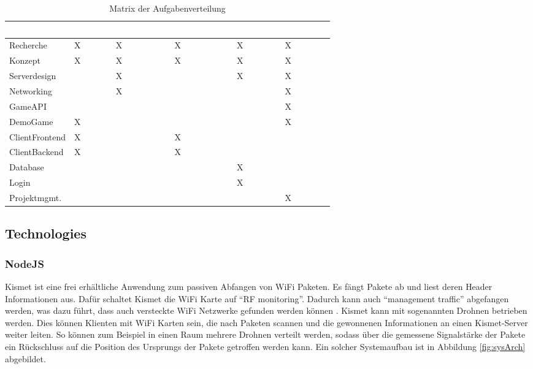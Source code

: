 \documentclass[a4paper]{spie}  %
\begin{document}
\begin{table}
	\label{table:distribution of tasks}
	\centering
		\caption{Matrix der Aufgabenverteilung}
		\begin{tabular}{| L{2.6cm} | C{2cm} | C{2cm} | C{2cm} | C{2cm} | C{2cm} |}
		\hline
		\textcolor{white}{\textbf{Aufgabe}} & \textcolor{white}{\textbf{Schleiss}} & \textcolor{white}{\textbf{Grothknopf}} & \textcolor{white}{\textbf{Schiwkowksi}} & \textcolor{white}{\textbf{Hofmann}} & \textcolor{white}{\textbf{Heinrichs}}\\\hline
		Recherche 		& X & X	& X	& X	& X	\\\hline
		Konzept 		& X & X	& X	& X	& X	\\\hline
		Serverdesign	& 	& X & 	& X	& X \\\hline
		Networking		& 	& X	& 	&	& X	\\\hline
		GameAPI 		& 	&	&	&	& X	\\\hline
		DemoGame 		& X	&	&	&	& X	\\\hline
		ClientFrontend 	& X	&	& X	&	&	\\\hline
		ClientBackend 	& X	&	& X	&	&	\\\hline
		Database 	    & 	&	&	& X	& 	\\\hline
		Login 		    & 	& 	& 	& X	& 	\\\hline
		Projektmgmt. 	&	&	&	& 	& X	\\\hline
	\end{tabular} 
\end{table}

\subsection{Technologies}
\subsubsection{NodeJS}
Kismet ist eine frei erhältliche Anwendung zum passiven Abfangen von WiFi Paketen. Es fängt Pakete ab und liest deren Header Informationen aus. Dafür schaltet Kismet die WiFi Karte auf \enquote{RF monitoring}. Dadurch kann auch \enquote{management traffic} abgefangen werden, was dazu führt, dass auch versteckte WiFi Netzwerke gefunden werden können \cite{kismetIntro}. Kismet kann mit sogenannten Drohnen betrieben werden. Dies können Klienten mit WiFi Karten sein, die nach Paketen scannen und die gewonnenen Informationen an einen Kismet-Server weiter leiten. So können zum Beispiel in einen Raum mehrere Drohnen verteilt werden, sodass über die gemessene Signalstärke der Pakete ein Rückschluss auf die Position des Ursprungs der Pakete getroffen werden kann. Ein solcher Systemaufbau ist in Abbildung \ref{fig:sysArch} abgebildet.
\end{document}

